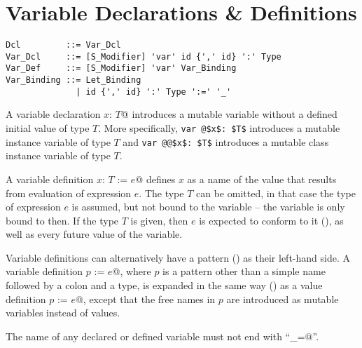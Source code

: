\section{Variable Declarations \& Definitions}
\label{sec:variable-dcl-def}

\syntax\begin{lstlisting}
Dcl         ::= Var_Dcl
Var_Dcl     ::= [S_Modifier] 'var' id {',' id} ':' Type
Var_Def     ::= [S_Modifier] 'var' Var_Binding
Var_Binding ::= Let_Binding
              | id {',' id} ':' Type ':=' '_'
\end{lstlisting}

A variable declaration \lstinline@var $x$: $T$@ introduces a mutable variable without a defined initial value of type $T$. More specifically, \lstinline+var @$x$: $T$+ introduces a mutable instance variable of type $T$ and \lstinline+var @@$x$: $T$+ introduces a mutable class instance variable of type $T$. 

A variable definition \lstinline@var $x$: $T$ := $e$@ defines $x$ as a name of the value that results from evaluation of expression $e$. The type $T$ can be omitted, in that case the type of expression $e$ is assumed, but not bound to the variable -- the variable is only bound to  then. If the type $T$ is given, then $e$ is expected to conform to it (), as well as every future value of the variable. 

Variable definitions can alternatively have a pattern () as their left-hand side. A variable definition \lstinline@var $p$ := $e$@, where $p$ is a pattern other than a simple name followed by a colon and a type, is expanded in the same way () as a value definition \lstinline@val $p$ := $e$@, except that the free names in $p$ are introduced as mutable variables instead of values. 

The name of any declared or defined variable must not end with ``\lstinline@_=@''. 

